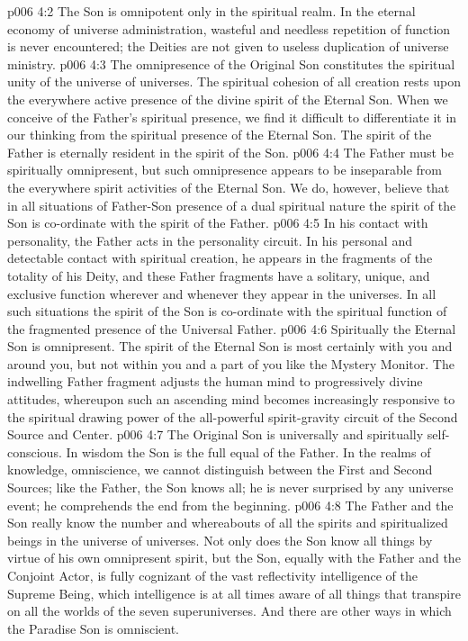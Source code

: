 \pc \vs p006 4:2 The Son is omnipotent only in the spiritual realm. In the eternal economy of universe administration, wasteful and needless repetition of function is never encountered; the Deities are not given to useless duplication of universe ministry.
\pc \vs p006 4:3 The omnipresence of the Original Son constitutes the spiritual unity of the universe of universes. The spiritual cohesion of all creation rests upon the everywhere active presence of the divine spirit of the Eternal Son. When we conceive of the Father’s spiritual presence, we find it difficult to differentiate it in our thinking from the spiritual presence of the Eternal Son. The spirit of the Father is eternally resident in the spirit of the Son.
\vs p006 4:4 The Father must be spiritually omnipresent, but such omnipresence appears to be inseparable from the everywhere spirit activities of the Eternal Son. We do, however, believe that in all situations of Father\hyp{}Son presence of a dual spiritual nature the spirit of the Son is co\hyp{}ordinate with the spirit of the Father.
\vs p006 4:5 In his contact with personality, the Father acts in the personality circuit. In his personal and detectable contact with spiritual creation, he appears in the fragments of the totality of his Deity, and these Father fragments have a solitary, unique, and exclusive function wherever and whenever they appear in the universes. In all such situations the spirit of the Son is co\hyp{}ordinate with the spiritual function of the fragmented presence of the Universal Father.
\vs p006 4:6 Spiritually the Eternal Son is omnipresent. The spirit of the Eternal Son is most certainly with you and around you, but not within you and a part of you like the Mystery Monitor. The indwelling Father fragment adjusts the human mind to progressively divine attitudes, whereupon such an ascending mind becomes increasingly responsive to the spiritual drawing power of the all\hyp{}powerful spirit\hyp{}gravity circuit of the Second Source and Center.
\pc \vs p006 4:7 The Original Son is universally and spiritually self\hyp{}conscious. In wisdom the Son is the full equal of the Father. In the realms of knowledge, omniscience, we cannot distinguish between the First and Second Sources; like the Father, the Son knows all; he is never surprised by any universe event; he comprehends the end from the beginning.\plusone
\pc \vs p006 4:8 The Father and the Son really know the number and whereabouts of all the spirits and spiritualized beings in the universe of universes. Not only does the Son know all things by virtue of his own omnipresent spirit, but the Son, equally with the Father and the Conjoint Actor, is fully cognizant of the vast reflectivity intelligence of the Supreme Being, which intelligence is at all times aware of all things that transpire on all the worlds of the seven superuniverses. And there are other ways in which the Paradise Son is omniscient.
